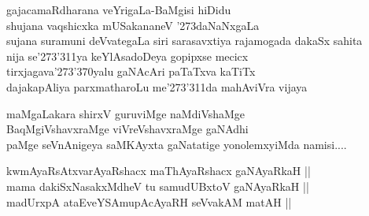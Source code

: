 \begin{entry}
\smallskip
\begin{shl}
gajacamaRdharana veYrigaLa-BaMgisi hiDidu\\
shujana vaqshicxka mUSakananeV \char'273daNaNxgaLa\\
sujana suramuni deVvategaLa siri sarasavxtiya rajamogada dakaSx sahita\\
nija se\char'273\char'311ya keYlAsadoDeya gopipxse mecicx\\ 
tirxjagava\char'273\char'370yalu gaNAcAri paTaTxva kaTiTx\\
dajakapAliya parxmatharoLu me\char'273\char'311da mahAviVra vijaya\\
\end{shl}
\smallskip
{}
\smallskip
{}
\end{entry}

\begin{entry}
\medskip

\begin{shl}
maMgaLakara shirxV guruviMge naMdiVshaMge\\
BaqMgiVshavxraMge viVreVshavxraMge gaNAdhi\\
paMge seVnAnigeya saMKAyxta gaNatatige yonolemxyiMda namisi....
\end{shl}
\smallskip
{}
\end{entry}

\begin{entry}
\smallskip
\begin{shl}
kwmAyaRsAtxvarAyaRshacx maThAyaRshacx gaNAyaRkaH ||\\
mama dakiSxNasakxMdheV tu samudUBxtoV gaNAyaRkaH ||\\
madUrxpA ataEveYSAmupAcAyaRH seVvakAM matAH ||
\end{shl}
\smallskip
{}
\end{entry}

